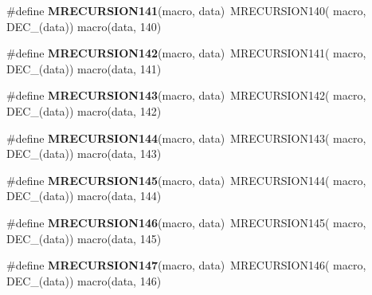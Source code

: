 \begin{DoxyCompactItemize}
\item 
\hypertarget{group__group__sam0__utils__mrecursion_ga5868ade7134f4814c3e19853c9cd518c}{}\#define {\bfseries M\+R\+E\+C\+U\+R\+S\+I\+O\+N141}(macro,  data)~M\+R\+E\+C\+U\+R\+S\+I\+O\+N140(  macro, D\+E\+C\+\_\+(data))   macro(data, 140)\label{group__group__sam0__utils__mrecursion_ga5868ade7134f4814c3e19853c9cd518c}

\item 
\hypertarget{group__group__sam0__utils__mrecursion_ga815d871c17da260055328809979ff474}{}\#define {\bfseries M\+R\+E\+C\+U\+R\+S\+I\+O\+N142}(macro,  data)~M\+R\+E\+C\+U\+R\+S\+I\+O\+N141(  macro, D\+E\+C\+\_\+(data))   macro(data, 141)\label{group__group__sam0__utils__mrecursion_ga815d871c17da260055328809979ff474}

\item 
\hypertarget{group__group__sam0__utils__mrecursion_ga13c48d426b2457b2bb7ded0974e15122}{}\#define {\bfseries M\+R\+E\+C\+U\+R\+S\+I\+O\+N143}(macro,  data)~M\+R\+E\+C\+U\+R\+S\+I\+O\+N142(  macro, D\+E\+C\+\_\+(data))   macro(data, 142)\label{group__group__sam0__utils__mrecursion_ga13c48d426b2457b2bb7ded0974e15122}

\item 
\hypertarget{group__group__sam0__utils__mrecursion_ga287fe5ff9404d3037343ce6cb798718d}{}\#define {\bfseries M\+R\+E\+C\+U\+R\+S\+I\+O\+N144}(macro,  data)~M\+R\+E\+C\+U\+R\+S\+I\+O\+N143(  macro, D\+E\+C\+\_\+(data))   macro(data, 143)\label{group__group__sam0__utils__mrecursion_ga287fe5ff9404d3037343ce6cb798718d}

\item 
\hypertarget{group__group__sam0__utils__mrecursion_ga3314ae66e82b16e923a2925e15839602}{}\#define {\bfseries M\+R\+E\+C\+U\+R\+S\+I\+O\+N145}(macro,  data)~M\+R\+E\+C\+U\+R\+S\+I\+O\+N144(  macro, D\+E\+C\+\_\+(data))   macro(data, 144)\label{group__group__sam0__utils__mrecursion_ga3314ae66e82b16e923a2925e15839602}

\item 
\hypertarget{group__group__sam0__utils__mrecursion_ga266f741d92739be1a64e16447fe11eca}{}\#define {\bfseries M\+R\+E\+C\+U\+R\+S\+I\+O\+N146}(macro,  data)~M\+R\+E\+C\+U\+R\+S\+I\+O\+N145(  macro, D\+E\+C\+\_\+(data))   macro(data, 145)\label{group__group__sam0__utils__mrecursion_ga266f741d92739be1a64e16447fe11eca}

\item 
\hypertarget{group__group__sam0__utils__mrecursion_ga30a38947003689daf96eaf919fa90bbf}{}\#define {\bfseries M\+R\+E\+C\+U\+R\+S\+I\+O\+N147}(macro,  data)~M\+R\+E\+C\+U\+R\+S\+I\+O\+N146(  macro, D\+E\+C\+\_\+(data))   macro(data, 146)\label{group__group__sam0__utils__mrecursion_ga30a38947003689daf96eaf919fa90bbf}


\end{DoxyCompactItemize}

